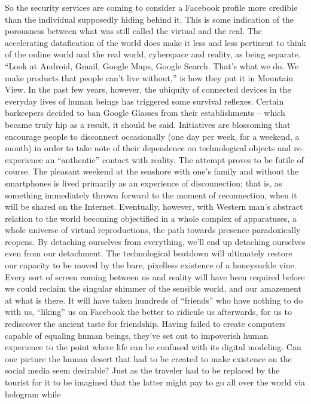 \documentclass[landscape,twocolumn,letterpaper]{article}
\begin{document}
So the security services are coming to consider a Facebook profile
more credible than the individual supposedly hiding behind it. This is
some indication of the porousness between what was still called the
virtual and the real. The accelerating datafication of the world does
make it less and less pertinent to think of the online world and the
real world, cyberspace and reality, as being separate. “Look at
Android, Gmail, Google Maps, Google Search. That’s what we do. We make
products that people can’t live without,” is how they put it in
Mountain View. In the past few years, however, the ubiquity of
connected devices in the everyday lives of human beings has triggered
some survival reflexes. Certain barkeepers decided to ban Google
Glasses from their establishments – which became truly hip as a
result, it should be said. Initiatives are blossoming that encourage
people to disconnect occasionally (one day per week, for a weekend, a
month) in order to take note of their dependence on technological
objects and re-experience an “authentic” contact with reality. The
attempt proves to be futile of course. The pleasant weekend at the
seashore with one’s family and without the smartphones is lived
primarily as an experience of disconnection; that is, as something
immediately thrown forward to the moment of reconnection, when it will
be shared on the Internet. Eventually, however, with Western man’s
abstract relation to the world becoming objectified in a whole complex
of apparatuses, a whole universe of virtual reproductions, the path
towards presence paradoxically reopens. By detaching ourselves from
everything, we’ll end up detaching ourselves even from our
detachment. The technological beatdown will ultimately restore our
capacity to be moved by the bare, pixelless existence of a honeysuckle
vine. Every sort of screen coming between us and reality will have
been required before we could reclaim the singular shimmer of the
sensible world, and our amazement at what is there. It will have taken
hundreds of “friends” who have nothing to do with us, “liking” us on
Facebook the better to ridicule us afterwards, for us to rediscover
the ancient taste for friendship. Having failed to create computers
capable of equaling human beings, they’ve set out to impoverish human
experience to the point where life can be confused with its digital
modeling. Can one picture the human desert that had to be created to
make existence on the social media seem desirable? Just as the
traveler had to be replaced by the tourist for it to be imagined that
the latter might pay to go all over the world via hologram while
\end{document}
